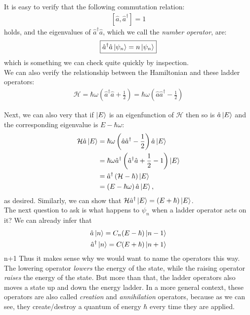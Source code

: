 \documentclass{book}
\theoremstyle{definition}
\newcommand{\ham}{\mathcal{H}}
\newcommand{\f}[2]{\frac{#1}{#2}}
\newcommand{\lp}{\left(}
\newcommand{\rp}{\right)}
\begin{document}
It is easy to verify that the following commutation relation:
\begin{align}
\boxed{[\hat{a}, \hat{a}^\dagger] = 1}
\end{align}
holds, and the eigenvalues of $\hat{a}^\dagger\hat{a}$, which we call the \textit{number operator}, are:
\begin{align}
\boxed{\hat{a}^\dagger\hat{a}\ket{\psi_n} = n\ket{\psi_n}}
\end{align}
which is something we can check quite quickly by inspection. \\

We can also verify the relationship between the Hamiltonian and these ladder operators:
\begin{align}
\boxed{\ham = \hbar\omega \lp \hat{a}^\dagger \hat{a}+ \f{1}{2} \rp = \hbar \omega \lp \hat{a}\hat{a}^\dagger - \f{1}{2} \rp}
\end{align}


Next, we can also very that if $\ket{E}$ is an eigenfunction of $\ham$ then so is $\hat{a}\ket{E}$ and the corresponding eigenvalue is $E - \hbar\omega$:
\begin{align}
\ham \hat{a}\ket{E} &= \hbar \omega \lp \hat{a}\hat{a}^\dagger - \f{1}{2} \rp \hat{a}\ket{E}\\
&= \hbar\omega \hat{a}^\dagger \lp \hat{a}^\dagger \hat{a} + \f{1}{2} - 1 \rp\ket{E}\\
&= \hat{a}^\dagger \lp \ham - \hbar \rp\ket{E}\\
&= \lp E - \hbar \omega \rp\hat{a}\ket{E},
\end{align} 
as desired. Similarly, we can show that $\ham\hat{a}^\dagger\ket{E} = (E + \hbar)\ket{E}$. \\

The next question to ask is what happens to $\psi_n$ when a ladder operator acts on it? We can already infer that 
\begin{align}
\hat{a}\ket{n} = C_n (E - \hbar)\ket{n - 1} \\ 
\hat{a}^\dagger\ket{n}= C_{}(E + \hbar)\ket{n+1}
\end{align}n+1
Thus it makes sense why we would want to name the operators this way. The lowering operator \textit{lowers} the energy of the state, while the raising operator \textit{raises} the energy of the state. But more than that, the ladder operators also moves a state up and down the energy ladder. In a more general context, these operators are also called \textit{creation} and \textit{annihilation} operators, because as we can see, they create/destroy a quantum of energy $\hbar$ every time they are applied. \\
\end{document}
